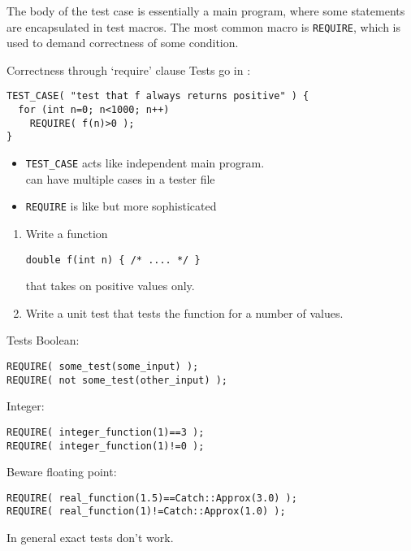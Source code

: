The body of the test case is essentially a main program,
where some statements are encapsulated in test macros.
The most common macro is \lstinline{REQUIRE},
which is used to demand correctness of some condition.

\begin{block}{Correctness through `require' clause}
  \label{sl:catch-case-require}
Tests go in :
\begin{lstlisting}
TEST_CASE( "test that f always returns positive" ) {
  for (int n=0; n<1000; n++)
    REQUIRE( f(n)>0 );  
}
\end{lstlisting}
\begin{itemize}
  \item
    \lstinline+TEST_CASE+ acts like independent main program.\\
    can have multiple cases in a tester file
    \item \lstinline{REQUIRE} is like  but more sophisticated
  \end{itemize}
\end{block}

\begin{exercise}
  \label{ex:catch-example}
  \begin{enumerate}
  \item Write a function
\begin{lstlisting}
double f(int n) { /* .... */ }
\end{lstlisting}
    that takes on positive values only.
  \item Write a unit test that tests the function for a number of values.
  \end{enumerate}
\end{exercise}

\begin{block}{Tests}
  \label{sl:catch-approx}
  Boolean:
\begin{lstlisting}
REQUIRE( some_test(some_input) );
REQUIRE( not some_test(other_input) );
\end{lstlisting}
Integer:
\begin{lstlisting}
REQUIRE( integer_function(1)==3 );
REQUIRE( integer_function(1)!=0 );
\end{lstlisting}
Beware floating point:
\begin{lstlisting}
REQUIRE( real_function(1.5)==Catch::Approx(3.0) );
REQUIRE( real_function(1)!=Catch::Approx(1.0) );
\end{lstlisting}
In general exact tests don't work.
\end{block}


